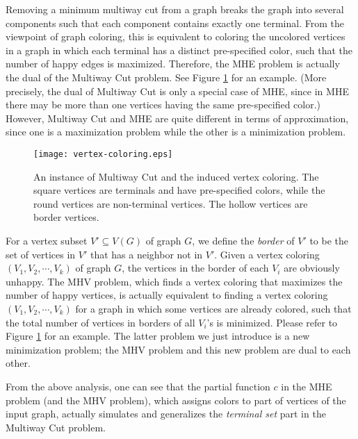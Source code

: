 \documentclass[11pt]{article}
\begin{document}
Removing a minimum multiway cut from a graph breaks the graph into several
components such that each component contains exactly one terminal.
From the viewpoint of graph coloring, this is equivalent to coloring the
uncolored vertices in a graph in which each terminal has a distinct
pre-specified color, such that the number of happy edges is maximized.
Therefore, the MHE problem is actually the dual of the Multiway Cut problem.
See Figure \ref{fig - multiway cut and vertex coloring} for an example.
(More precisely, the dual of Multiway Cut is only a special case of MHE,
since in MHE there may be more than one vertices having the same pre-specified
color.) However, Multiway Cut and MHE are quite different in terms of
approximation, since one is a maximization problem while the other is
a minimization problem.

\begin{figure}
\begin{center}
\texttt{[image: vertex-coloring.eps]}
\end{center}
\caption{An instance of Multiway Cut and the induced vertex coloring.
The square vertices are terminals and have pre-specified colors,
while the round vertices are non-terminal vertices.
The hollow vertices are border vertices.}
\label{fig - multiway cut and vertex coloring}
\end{figure}

For a vertex subset $V' \subseteq V(G)$ of graph $G$, we define the {\em border}
of $V'$ to be the set of vertices in $V'$ that has a neighbor not in $V'$.
Given a vertex coloring $(V_1, V_2, \cdots, V_k)$ of graph $G$,
the vertices in the border of each $V_i$ are obviously unhappy.
The MHV problem, which finds a vertex coloring that maximizes the number of
happy vertices, is actually equivalent to finding a vertex coloring
$(V_1, V_2, \cdots, V_k)$ for a graph in which some vertices are already
colored, such that the total number of vertices in borders of all $V_i$'s
is minimized. Please refer to Figure \ref{fig - multiway cut and vertex coloring}
for an example. The latter problem we just introduce is a new minimization
problem; the MHV problem and this new problem are dual to each other.

From the above analysis, one can see that the partial function $c$ in
the MHE problem (and the MHV problem), which assigns colors to part of
vertices of the input graph, actually simulates and generalizes
the {\em terminal set} part in the Multiway Cut problem.
\end{document}
